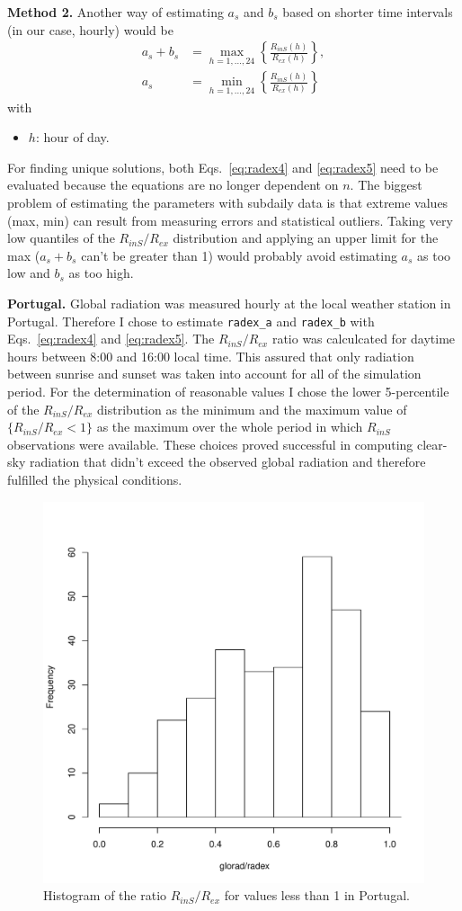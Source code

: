 \documentclass{scrreprt}
\newenvironment{denseitem}{
  \begin{itemize}
    \setlength{\itemsep}{0pt}
    \setlength{\parskip}{0pt}
    \setlength{\parsep}{0pt}
}{
  \end{itemize}
}
\begin{document}
\textbf{Method 2.}
Another way of estimating $a_s$ and $b_s$ based on shorter time intervals (in our case, hourly) would be
\begin{align}
  a_s + b_s &= \max_{h = 1, ..., 24} \left \{ \frac{R_{inS} (h)}{R_{ex} (h)} \right \}, \label{eq:radex4} \\
  a_s &= \min_{h = 1, ..., 24} \left \{ \frac{R_{inS} (h)}{R_{ex} (h)} \right \} \label{eq:radex5}
\end{align}
%
with
\begin{denseitem}
  \item[] $h$: hour of day.
\end{denseitem}
%
For finding unique solutions, both Eqs.~\eqref{eq:radex4} and \eqref{eq:radex5} need to be evaluated because the equations are no longer dependent on $n$.
The biggest problem of estimating the parameters with subdaily data is that extreme values (max, min) can result from measuring errors and statistical outliers.
Taking very low quantiles of the $R_{inS}/R_{ex}$ distribution and applying an upper limit for the max ($a_s + b_s$ can't be greater than 1) would probably avoid estimating $a_s$ as too low and $b_s$ as too high.

\textbf{Portugal.}
Global radiation was measured hourly at the local weather station in Portugal.
Therefore I chose to estimate \verb!radex_a! and \verb!radex_b! with Eqs.~\eqref{eq:radex4} and \eqref{eq:radex5}.
The $R_{inS}/R_{ex}$ ratio was calculcated for daytime hours between 8:00 and 16:00 local time.
This assured that only radiation between sunrise and sunset was taken into account for all of the simulation period.
For the determination of reasonable values I chose the lower 5-percentile of the $R_{inS}/R_{ex}$ distribution as the minimum and the maximum value of $\{R_{inS}/R_{ex} < 1\}$ as the maximum over the whole period in which $R_{inS}$ observations were available.
These choices proved successful in computing clear-sky radiation that didn't exceed the observed global radiation and therefore fulfilled the physical conditions.

\begin{figure}[ht]
  \centering
  \includegraphics[width=0.5\hsize]{./plot_radex1.pdf}
  \caption{Histogram of the ratio $R_{inS}/R_{ex}$ for values less than 1 in Portugal.}
  \label{fig:portugal_radex1}
\end{figure}
\end{document}
